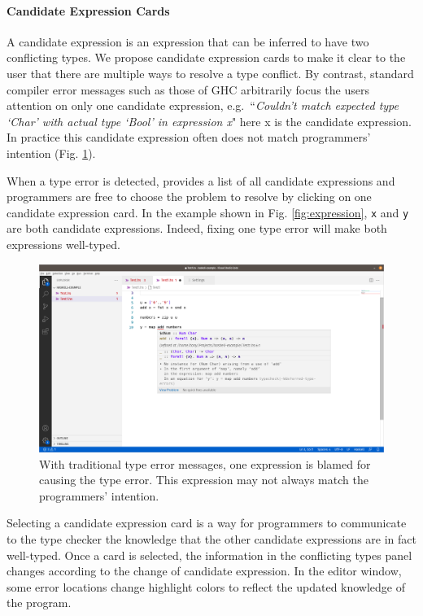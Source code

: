\paragraph{Candidate Expression Cards}  \label{sub:candidate-expression}

A candidate expression is an expression that can be inferred to have two conflicting types. 
We propose candidate expression cards to make it clear to the user that there are multiple ways to resolve a type conflict. By contrast,  standard compiler error messages such as those of GHC arbitrarily focus the users attention on only one candidate expression, e.g.\ ``\textit{Couldn't match expected type ‘Char’ with actual type ‘Bool’ in expression x}" here x is the candidate expression. In practice this candidate expression often does not match programmers' intention (Fig. \ref{fig:single-candidate}).  

When a type error is detected, \chameleon{} provides a list of all candidate expressions and programmers are free to choose the problem to resolve by clicking on one candidate expression card. In the example shown in Fig. \ref{fig:expression}, \texttt{x} and \texttt{y} are both candidate expressions. Indeed, fixing one type error will make both expressions well-typed.


\begin{figure}[h]
    \centering
    \includegraphics[width=\linewidth]{images/single-error-location-example.png}
    \caption{
With traditional type error messages, one expression is blamed for causing the type error. This expression may not always match the programmers' intention. 
    }
    \label{fig:single-candidate}
\end{figure}

Selecting a candidate expression card is a way for programmers to communicate to the type checker the knowledge that the other candidate expressions are in fact well-typed. Once a card is selected, the information in the conflicting types panel changes according to the change of candidate expression. In the editor window, some error locations change highlight colors to reflect the updated knowledge of the program. 


